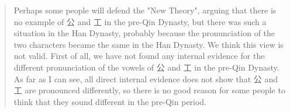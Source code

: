 \begin{quote}
Perhaps some people will defend the "New Theory", arguing that there is no example of 公 and 工 in the pre-Qin Dynasty, but there was such a situation in the Han Dynasty, probably because the pronunciation of the two characters became the same in the Han Dynasty. We think this view is not valid. First of all, we have not found any internal evidence for the different pronunciation of the vowels of 公 and 工 in the pre-Qin Dynasty. As far as I can see, all direct internal evidence does not show that 公 and 工 are pronounced differently, so there is no good reason for some people to think that they sound different in the pre-Qin period. 
\end{quote}
